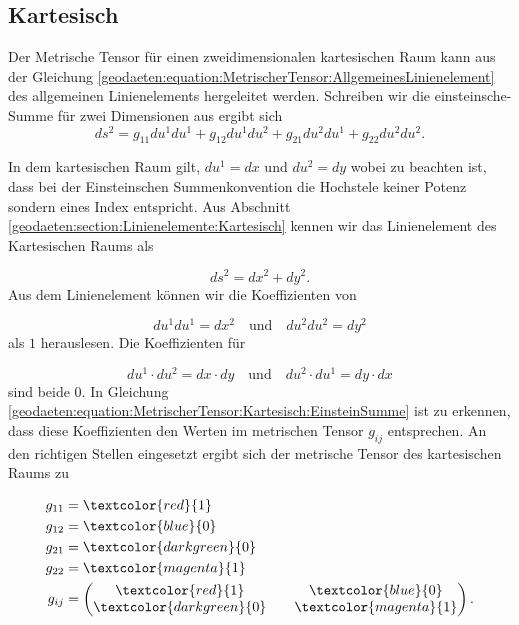 %
%
%
%
\subsection{Kartesisch\label{geodaeten:section:MetrischerTensor:Kartesisch}}

Der Metrische Tensor für einen zweidimensionalen kartesischen Raum kann aus der Gleichung \eqref{geodaeten:equation:MetrischerTensor:AllgemeinesLinienelement} des allgemeinen Linienelements hergeleitet werden.
Schreiben wir die einsteinsche-Summe für zwei Dimensionen aus ergibt sich
\begin{equation}
	ds^2 = g_{11}  du^1  du^1 + g_{12}  du^1  du^2 + g_{21}  du^2  du^1 + g_{22}  du^2  du^2 .
	\label{geodaeten:equation:MetrischerTensor:Kartesisch:EinsteinSumme}
\end{equation}

In dem kartesischen Raum gilt, $du^1 = dx$ und $du^2 = dy$ wobei zu beachten ist, dass bei der Einsteinschen Summenkonvention die Hochstele keiner Potenz sondern eines Index entspricht.
Aus Abschnitt \ref{geodaeten:section:Linienelemente:Kartesisch} kennen wir das Linienelement des Kartesischen Raums als

\begin{equation}
	ds^2 = dx^2 + dy^2 .
\end{equation}
Aus dem Linienelement können wir die Koeffizienten von 

\begin{equation}
du^1 du^1 = dx^2 \quad \text{und} \quad du^2  du^2 = dy^2 
\end{equation}
als $1$ herauslesen.
Die Koeffizienten für

\begin{equation}
du^1 \cdot du^2 = dx \cdot dy \quad \text{und} \quad du^2 \cdot du^1 = dy \cdot dx
\end{equation}
sind beide $0$.
In Gleichung \ref{geodaeten:equation:MetrischerTensor:Kartesisch:EinsteinSumme} ist zu erkennen, dass diese Koeffizienten den Werten im metrischen Tensor $g_{ij}$ entsprechen.
An den richtigen Stellen eingesetzt ergibt sich der metrische Tensor des kartesischen Raums zu

\begin{equation}
	\begin{aligned}
		g_{11} &= \textcolor{red}{1} \\
		g_{12} &= \textcolor{blue}{0} \\
		g_{21} &= \textcolor{darkgreen}{0} \\
		g_{22} &= \textcolor{magenta}{1} \\
		g_{ij} &= \begin{pmatrix} \textcolor{red}{1} && \textcolor{blue}{0} \\ \textcolor{darkgreen}{0} && \textcolor{magenta}{1} \end{pmatrix} .
	\end{aligned}
\end{equation}

